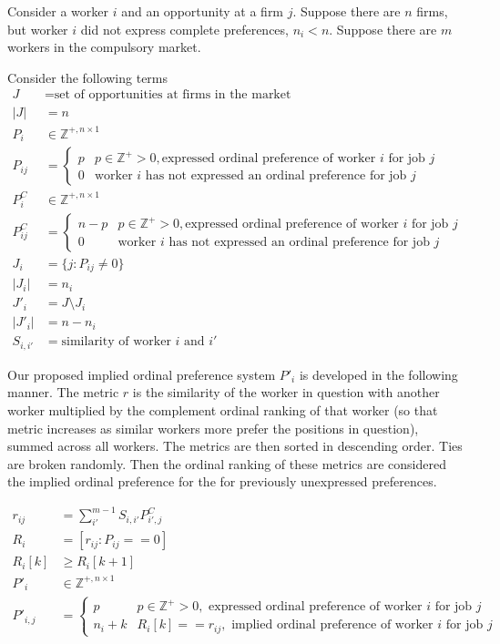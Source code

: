 Consider a worker $i$ and an opportunity at a firm $j$. Suppose there are $n$ firms, but worker $i$ did not express complete preferences, $n_i < n$. Suppose there are $m$ workers in the compulsory market.

Consider the following terms 
\begin{align*}
J &= \text{set of opportunities at firms in the market} \\
|J| &= n \\
P_i & \in \mathbb{Z}^{+, n \times 1} \\
P_{ij} &= \begin{cases}
p & p \in \mathbb{Z}^+ > 0, \text{expressed ordinal preference of worker $i$ for job $j$}\\
0 & \text{worker $i$ has not expressed an ordinal preference for job $j$}
\end{cases} \\
P^C_i & \in \mathbb{Z}^{+, n \times 1} \\
P^C_{ij} &= \begin{cases}
n-p & p \in \mathbb{Z}^+ > 0, \text{expressed ordinal preference of worker $i$ for job $j$}\\
0 & \text{worker $i$ has not expressed an ordinal preference for job $j$}
\end{cases} \\
J_i &= \{j : P_{ij} \neq 0\} \\
|J_i| &= n_i \\
J'_i &= J \setminus J_i \\
|J'_i| &= n - n_i \\
S_{i, i'} &= \text{similarity of worker $i$ and $i'$}
\end{align*}

Our proposed implied ordinal preference system $P'_i$ is developed in the following manner. The metric $r$ is the similarity of the worker in question with another worker multiplied by the complement ordinal ranking of that worker (so that metric increases as similar workers more prefer the positions in question), summed across all workers. The metrics are then sorted in descending order. Ties are broken randomly. Then the ordinal ranking of these metrics are considered the implied ordinal preference for the for previously unexpressed preferences.

\begin{align*}
r_{ij} &= \sum_{i'}^{m-1}S_{i,i'} P^C_{i',j} \\
R_i &= [r_{ij}: P_{ij} == 0] \\
R_i[k] & \geq R_i[k+1] \\
P'_i & \in \mathbb{Z}^{+, n \times 1} \\
P'_{i,j} &= \begin{cases}
p & p \in \mathbb{Z}^+ > 0, \text{ expressed ordinal preference of worker $i$ for job $j$}\\
n_i + k & R_i[k] == r_{ij}, \text{ implied ordinal preference of worker $i$ for job $j$}
\end{cases} \\
\end{align*}
